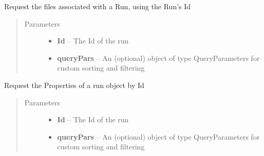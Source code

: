 \documentclass[letterpaper,10pt,english]{sphinxmanual}
\begin{document}
\begin{fulllineitems}
\begin{fulllineitems}
\end{fulllineitems}


\begin{fulllineitems}
\label{Available modules:BaseSpacePy.api.BaseSpaceAPI.BaseSpaceAPI.getRunFilesById}
Request the files associated with a Run, using the Run's Id
\begin{quote}\begin{description}
\item[{Parameters}] \leavevmode\begin{itemize}
\item {} 
\textbf{Id} -- The Id of the run

\item {} 
\textbf{queryPars} -- An (optional) object of type QueryParameters for custom sorting and filtering

\end{itemize}

\end{description}\end{quote}

\end{fulllineitems}


\begin{fulllineitems}
\label{Available modules:BaseSpacePy.api.BaseSpaceAPI.BaseSpaceAPI.getRunPropertiesById}
Request the Properties of a run object by Id
\begin{quote}\begin{description}
\item[{Parameters}] \leavevmode\begin{itemize}
\item {} 
\textbf{Id} -- The Id of the run

\item {} 
\textbf{queryPars} -- An (optional) object of type QueryParameters for custom sorting and filtering

\end{itemize}

\end{description}\end{quote}


\end{fulllineitems}
\end{fulllineitems}
\end{document}
